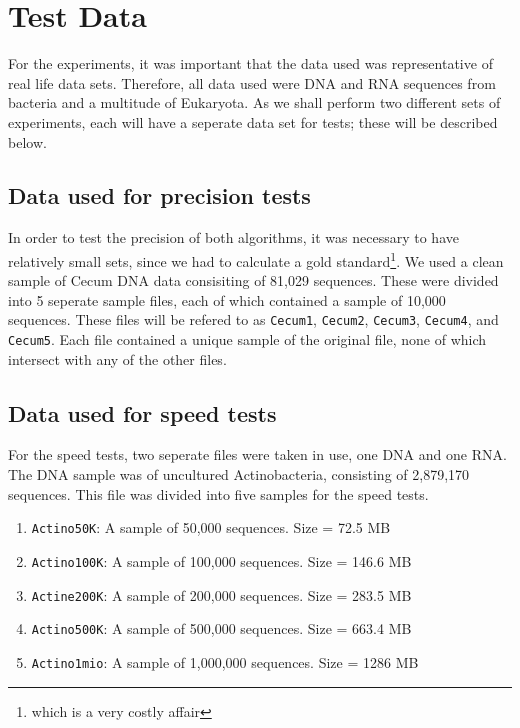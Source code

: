 \documentclass[../../main.tex]{subfiles}
\begin{document}
\section{Test Data}
For the experiments, it was important that the data used was representative of real life data sets. Therefore, all data used were DNA and RNA sequences from bacteria and a multitude of Eukaryota. As we shall perform two different sets of experiments, each will have a seperate data set for tests; these will be described below.
\subsection{Data used for precision tests}
In order to test the precision of both algorithms, it was necessary to have relatively small sets, since we had to calculate a gold standard\footnote{which is a very costly affair}. We used a clean sample of Cecum DNA data consisiting of 81,029 sequences. These were divided into 5 seperate sample files, each of which contained a sample of 10,000 sequences. These files will be refered to as \texttt{Cecum1}, \texttt{Cecum2}, \texttt{Cecum3}, \texttt{Cecum4}, and \texttt{Cecum5}. Each file contained a unique sample of the original file, none of which intersect with any of the other files.


\subsection{Data used for speed tests}
For the speed tests, two seperate files were taken in use, one DNA and one RNA. The DNA sample was of uncultured Actinobacteria, consisting of 2,879,170 sequences. This file was divided into five samples for the speed tests.
\begin{enumerate}
\item \texttt{Actino50K}: A sample of 50,000 sequences. Size = 72.5 MB
\item \texttt{Actino100K}: A sample of 100,000 sequences. Size = 146.6 MB
\item \texttt{Actine200K}: A sample of 200,000 sequences. Size = 283.5 MB
\item \texttt{Actino500K}: A sample of 500,000 sequences. Size = 663.4 MB
\item \texttt{Actino1mio}: A sample of 1,000,000 sequences. Size = 1286 MB
\end{enumerate}
\end{document}
